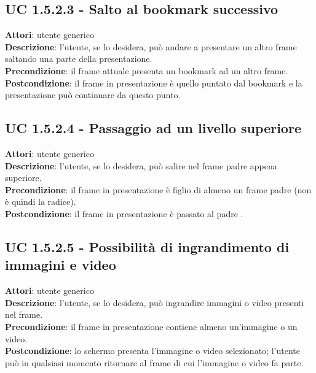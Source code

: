 	\subsection{UC 1.5.2.3 - Salto al bookmark successivo}{
		\label{uc1.5.2.3}
		\textbf{Attori}: utente generico \\
		\textbf{Descrizione}: l'utente, se lo desidera, può andare a presentare un altro frame saltando una parte della presentazione. \\
		\textbf{Precondizione}: il frame attuale presenta un bookmark ad un altro frame.	\\
		\textbf{Postcondizione}: il frame in presentazione è quello puntato dal bookmark e la presentazione può continuare da questo punto.	\\
	}
	\subsection{UC 1.5.2.4 - Passaggio ad un livello superiore}{
		\label{uc1.5.2.4}
		\textbf{Attori}: utente generico \\
		\textbf{Descrizione}: l'utente, se lo desidera, può salire nel frame padre appena superiore. \\
		\textbf{Precondizione}: il frame in presentazione è figlio di almeno un frame padre (non è quindi la radice).	\\
		\textbf{Postcondizione}: il frame in presentazione è passato al padre .	\\
	}
	\subsection{UC 1.5.2.5 - Possibilità di ingrandimento di immagini e video}{
		\label{uc1.5.2.5}
		\textbf{Attori}: utente generico \\
		\textbf{Descrizione}: l'utente, se lo desidera, può ingrandire immagini o video presenti nel frame. \\
		\textbf{Precondizione}: il frame in presentazione contiene almeno un'immagine o un video.	\\
		\textbf{Postcondizione}: lo schermo presenta l'immagine o video selezionato; l'utente può in qualsiasi momento ritornare al frame di cui l'immagine o video fa parte.	\\
	}
